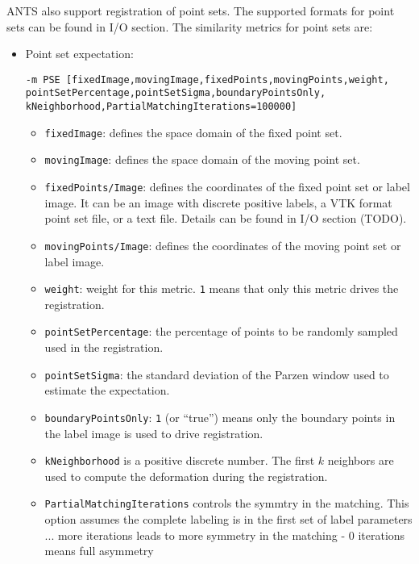ANTS also support registration of point sets. The supported formats for point sets can be found in I/O section. The similarity metrics for point sets are:
\begin{itemize}
    \item Point set expectation: 
     \begin{verbatim}
-m PSE [fixedImage,movingImage,fixedPoints,movingPoints,weight,
pointSetPercentage,pointSetSigma,boundaryPointsOnly,
kNeighborhood,PartialMatchingIterations=100000]
    \end{verbatim}
    \begin{itemize}
        \item \verb"fixedImage": defines the space domain of the fixed point set.
        \item \verb"movingImage": defines the space domain of the moving point set.
        \item \verb"fixedPoints/Image": defines the coordinates of the fixed point set or label image. It can be an image with discrete positive labels, a VTK format point set file, or a text file. Details can be found in I/O section (TODO).
        \item \verb"movingPoints/Image": defines the coordinates of the moving point set or label image. 
        \item \verb"weight": weight for this metric. \verb"1" means that only this metric drives the registration.
        \item \verb"pointSetPercentage": the percentage of points to be randomly sampled used in the registration.
        \item \verb"pointSetSigma": the standard deviation of the Parzen window used to estimate the expectation. 
        \item \verb"boundaryPointsOnly":  \verb"1" (or ``true'') means only the boundary points in the label image is used to drive registration.
        \item \verb"kNeighborhood" is a positive discrete number. The first $k$ neighbors are used to compute the deformation during the registration. 
        \item \verb"PartialMatchingIterations" controls the symmtry in the matching. This option assumes the complete labeling is in the first set of label parameters ... more iterations leads to more symmetry in the matching  - 0 iterations means full asymmetry 
    \end{itemize}


\end{itemize}
